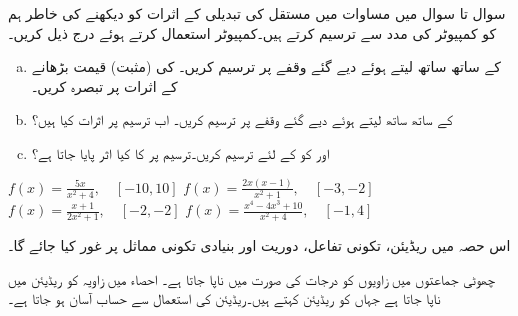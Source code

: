 سوال  تا سوال  میں مساوات  میں مستقل  کی تبدیلی کے اثرات کو دیکھنے کی خاطر ہم  کو کمپیوٹر کی مدد سے ترسیم کرتے ہیں۔کمپیوٹر استعمال کرتے ہوئے درج ذیل کریں۔
\begin{enumerate}[a.]
\item
{} کے ساتھ ساتھ  لیتے ہوئے دیے گئے وقفے پر  ترسیم کریں۔  کی (مثبت) قیمت  بڑھانے کے اثرات پر تبصرہ کریں۔
\item
{} کے ساتھ ساتھ  لیتے ہوئے دیے گئے وقفے پر  ترسیم کریں۔ اب ترسیم پر اثرات کیا ہیں؟
\item
{} اور  کو  کے لئے ترسیم کریں۔ترسیم پر  کا کیا اثر پایا جاتا ہے؟
\end{enumerate}

$f(x)=\tfrac{5x}{x^2+4},\quad [-10,10]$
$f(x)=\tfrac{2x(x-1)}{x^2+1},\quad [-3,-2]$
$f(x)=\tfrac{x+1}{2x^2+1},\quad [-2,-2]$
$f(x)=\tfrac{x^4-4x^3+10}{x^2+4},\quad [-1,4]$



اس حصہ میں ریڈیئن، تکونی تفاعل، دوریت اور بنیادی تکونی مماثل پر غور کیا جائے گا۔ 

چھوٹی جماعتوں میں زاویوں کو درجات کی صورت میں ناپا جاتا ہے۔ احصاء میں زاویہ کو ریڈیئن میں ناپا جاتا ہے جہاں  کو  ریڈیئن کہتے ہیں۔ریڈیئن کی استعمال سے حساب آسان ہو جاتا ہے۔

